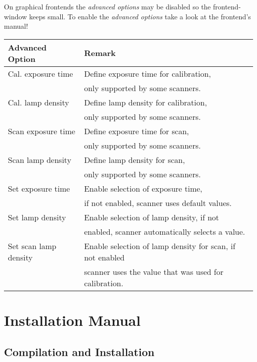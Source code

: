 \newpage

On graphical frontends the \emph{advanced options}
may be disabled so the frontend-window keeps small.
To enable the \emph{advanced options}
take a look at the frontend's manual!\\

 \begin{figure}[h]
   \centerline{ \epsfxsize=6cm }
 \end{figure}

\small
\begin{tabular}{|l|l|}
\hline
Advanced Option&Remark\\
\hline
\hline
Cal. exposure time&Define exposure time for calibration,\\
&only supported by some scanners.\\
\hline
Cal. lamp density&Define lamp density for calibration,\\
&only supported by some scanners.\\
\hline
Scan exposure time&Define exposure time for scan,\\
&only supported by some scanners.\\
\hline
Scan lamp density&Define lamp density for scan,\\
&only supported by some scanners.\\
\hline
Set exposure time&Enable selection of exposure time,\\
&if not enabled, scanner uses default values.\\
\hline
Set lamp density&Enable selection of lamp density, if not\\
&enabled, scanner automatically selects a value.\\
\hline
Set scan lamp density&Enable selection of lamp density for scan, if not enabled\\
&scanner uses the value that was used for calibration.\\
\hline
\end{tabular}
\normalsize



\newpage
\section{ Installation Manual}

\subsection{Compilation and Installation}

